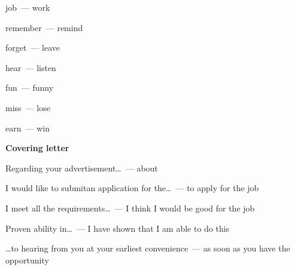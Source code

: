 \documentclass[10pt,a4paper]{article}
\begin{document}
job~--- work

remember~--- remind

forget~--- leave

hear~--- listen

fun~--- funny

miss~--- lose

earn~--- win

\textbf{Covering letter}

Regarding your advertisement\dots ~--- about

I would like to submitan application for the\dots ~--- to apply for the job

I meet all the requirements\dots ~--- I think I would be good for the job

Proven ability in\dots ~--- I have shown that I am able to do this

\vspace{6pt}\dots to hearing from you at your earliest convenience~--- as soon as you have the opportunity
\end{document}
